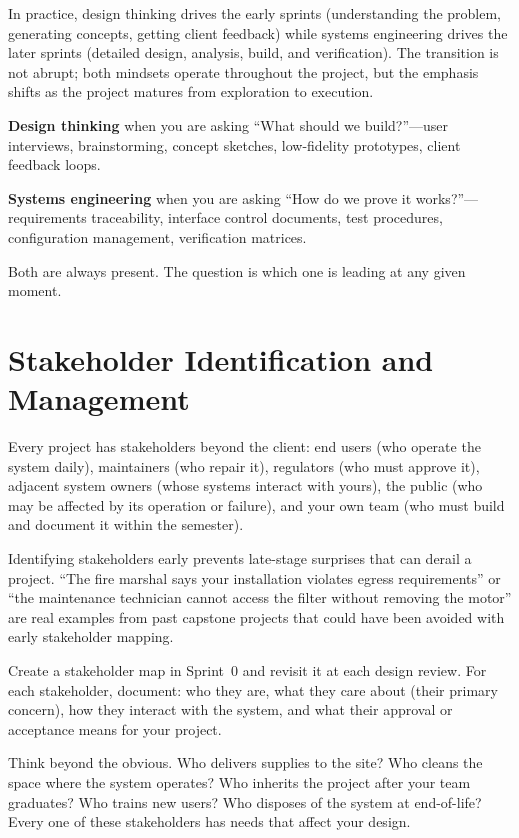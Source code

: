 In practice, design thinking drives the early sprints (understanding the problem, generating concepts, getting client feedback) while systems engineering drives the later sprints (detailed design, analysis, build, and verification). The transition is not abrupt; both mindsets operate throughout the project, but the emphasis shifts as the project matures from exploration to execution.

\begin{keyconceptbox}
\textbf{Design thinking} when you are asking ``What should we build?''---user interviews, brainstorming, concept sketches, low-fidelity prototypes, client feedback loops.

\textbf{Systems engineering} when you are asking ``How do we prove it works?''---requirements traceability, interface control documents, test procedures, configuration management, verification matrices.

Both are always present. The question is which one is leading at any given moment.
\end{keyconceptbox}


\section{Stakeholder Identification and Management}
Every project has stakeholders beyond the client: end users (who operate the system daily), maintainers (who repair it), regulators (who must approve it), adjacent system owners (whose systems interact with yours), the public (who may be affected by its operation or failure), and your own team (who must build and document it within the semester).

Identifying stakeholders early prevents late-stage surprises that can derail a project. ``The fire marshal says your installation violates egress requirements'' or ``the maintenance technician cannot access the filter without removing the motor'' are real examples from past capstone projects that could have been avoided with early stakeholder mapping.

Create a stakeholder map in Sprint~0 and revisit it at each design review. For each stakeholder, document: who they are, what they care about (their primary concern), how they interact with the system, and what their approval or acceptance means for your project.

\begin{tipbox}
Think beyond the obvious. Who delivers supplies to the site? Who cleans the space where the system operates? Who inherits the project after your team graduates? Who trains new users? Who disposes of the system at end-of-life? Every one of these stakeholders has needs that affect your design.
\end{tipbox}



